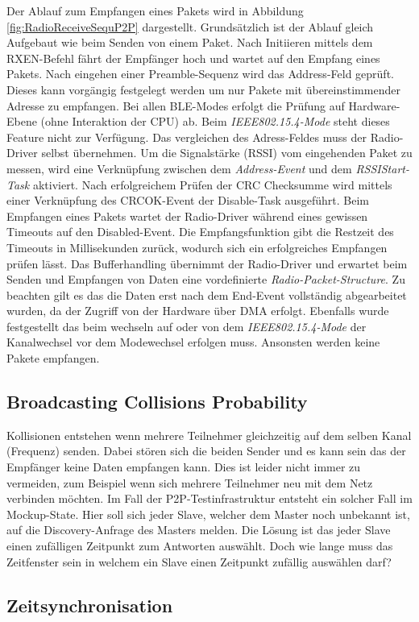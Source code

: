 Der Ablauf zum Empfangen eines Pakets wird in Abbildung \ref{fig:RadioReceiveSequP2P} dargestellt. Grundsätzlich ist der Ablauf gleich Aufgebaut wie beim Senden von einem Paket. Nach Initiieren mittels dem RXEN-Befehl fährt der Empfänger hoch und wartet auf den Empfang eines Pakets. Nach eingehen einer Preamble-Sequenz wird das Address-Feld geprüft. Dieses kann vorgängig festgelegt werden um nur Pakete mit übereinstimmender Adresse zu empfangen. Bei allen BLE-Modes erfolgt die Prüfung auf Hardware-Ebene (ohne Interaktion der CPU) ab. Beim \textit{IEEE802.15.4-Mode} steht dieses Feature nicht zur Verfügung. Das vergleichen des Adress-Feldes muss der Radio-Driver selbst übernehmen. Um die Signalstärke (RSSI) vom eingehenden Paket zu messen, wird eine Verknüpfung zwischen dem \textit{Address-Event} und dem \textit{RSSIStart-Task} aktiviert. Nach erfolgreichem Prüfen der CRC Checksumme wird mittels einer Verknüpfung des CRCOK-Event der Disable-Task ausgeführt. Beim Empfangen eines Pakets wartet der Radio-Driver während eines gewissen Timeouts auf den Disabled-Event. Die Empfangsfunktion gibt die Restzeit des Timeouts in Millisekunden zurück, wodurch sich ein erfolgreiches Empfangen prüfen lässt. Das Bufferhandling übernimmt der Radio-Driver und erwartet beim Senden und Empfangen von Daten eine vordefinierte \textit{Radio-Packet-Structure}. Zu beachten gilt es das die Daten erst nach dem End-Event  vollständig abgearbeitet wurden, da der Zugriff von der Hardware über DMA erfolgt. Ebenfalls wurde festgestellt das beim wechseln auf oder von dem \textit{IEEE802.15.4-Mode} der Kanalwechsel vor dem Modewechsel erfolgen muss. Ansonsten werden keine Pakete empfangen. \cite{nordic_semi_nrf_infocenter_radio_receive_sequence_2020}


\subsection{Broadcasting Collisions Probability}\label{sec:BroadcastingCollissionsProbability}

Kollisionen entstehen wenn mehrere Teilnehmer gleichzeitig auf dem selben Kanal (Frequenz) senden. Dabei stören sich die beiden Sender und es kann sein das der Empfänger keine Daten empfangen kann. Dies ist leider nicht immer zu vermeiden, zum Beispiel wenn sich mehrere Teilnehmer neu mit dem Netz verbinden möchten. Im Fall der P2P-Testinfrastruktur entsteht ein solcher Fall im Mockup-State. Hier soll sich jeder Slave, welcher dem Master noch unbekannt ist, auf die Discovery-Anfrage des Masters melden. Die Lösung ist das jeder Slave einen zufälligen Zeitpunkt zum Antworten auswählt. Doch wie lange muss das Zeitfenster sein in welchem ein Slave einen Zeitpunkt zufällig auswählen darf? \\



\subsection{Zeitsynchronisation}\label{sec:Zeitsynchronisation}

